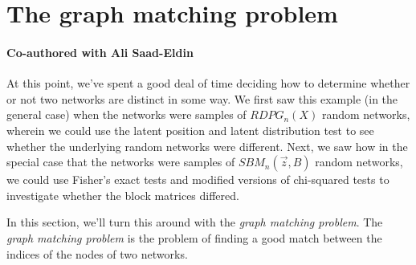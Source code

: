 \section{The graph matching problem}
\label{sec:ch8:gm}
\paragraph*{Co-authored with Ali Saad-Eldin}
At this point, we've spent a good deal of time deciding how to determine whether or not two networks are distinct in some way. We first saw this example (in the general case) when the networks were samples of $RDPG_n(X)$ random networks, wherein we could use the latent position and latent distribution test to see whether the underlying random networks were different. Next, we saw how in the special case that the networks were samples of $SBM_n(\vec z, B)$ random networks, we could use Fisher's exact tests and modified versions of chi-squared tests to investigate whether the block matrices differed.


In this section, we'll turn this around with the \textit{graph matching problem}. The \textit{graph matching problem} is the problem of finding a good match between the indices of the nodes of two networks.

